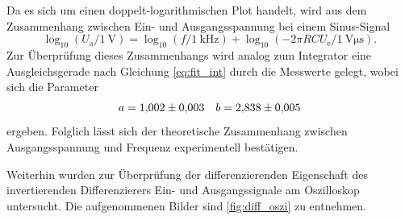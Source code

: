 Da es sich um einen doppelt-logarithmischen Plot handelt, wird aus dem Zusammenhang zwischen Ein- und Ausgangsspannung bei einem Sinus-Signal
\begin{equation*}
  \log_{10} (U_\mathrm{a}/\SI{1}{\volt}) = \log_{10} (f/\SI{1}{\kilo\hertz}) + \log_{10} (- 2 \pi R C U_\mathrm{e}/\SI{1}{\volt\micro\second}).
\end{equation*}
Zur Überprüfung dieses Zusammenhangs wird analog zum Integrator eine Ausgleichsgerade nach Gleichung \eqref{eq:fit_int} durch die Messwerte gelegt, wobei sich die Parameter
\begin{align*}
  a = \num{1.002 \pm 0.003} && b = \num{2.838 \pm 0.005}
\end{align*}
ergeben. Folglich lässt sich der theoretische Zusammenhang zwischen Ausgangsspannung und Frequenz experimentell bestätigen.

Weiterhin wurden zur Überprüfung der differenzierenden Eigenschaft des invertierenden Differenzierers Ein- und Ausgangssignale am Oszilloskop untersucht. Die aufgenommenen Bilder sind \autoref{fig:diff_oszi} zu entnehmen.

